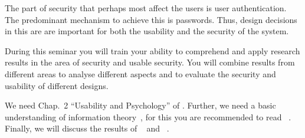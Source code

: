 The part of security that perhaps most affect the users is user authentication.
The predominant mechanism to achieve this is passwords.
Thus, design decisions in this are are important for both the usability and the 
security of the system.

During this seminar you will train your ability to comprehend and apply 
research results in the area of security and usable security.
You will combine results from different areas to analyse different aspects and 
to evaluate the security and usability of different designs.

We need Chap.~2 \enquote{Usability and Psychology} of \cite{Anderson2008sea}.
Further, we need a basic understanding of information 
theory~\cite{Shannon1948amt}, for this you are recommended to read 
~\cite{Ueltschi2013se}.
Finally, we will discuss the results of 
~\cite{Komanduri2011opa} and 
~\cite{Komanduri2014can}.

